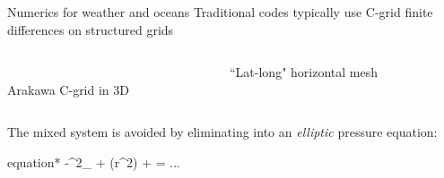 \documentclass[9pt]{beamer}
\begin{document}
\begin{frame}[c]{Numerics for weather and oceans}
	Traditional codes typically use C-grid finite differences
	on structured grids
	\begin{columns}
		\begin{column}{0.5\textwidth}
			\begin{center}
				\begin{tikzpicture}[thick, scale=0.5]
					
				\end{tikzpicture}\\
				Arakawa C-grid in 3D
			\end{center}
		\end{column}
		\hspace{-20pt}\begin{column}{0.5\textwidth}
			\begin{center}
				\begin{tikzpicture}[thick, scale=0.5]
					
				\end{tikzpicture}
				``Lat-long" horizontal mesh	
			\end{center}
		\end{column}
	\end{columns}
	The mixed system is avoided by eliminating into an
	\emph{elliptic} pressure equation:
	\begin{empheq}[box=\fbox]{equation*}
		-\omega\left\lbrack \nabla^2_ \Pi + 
		\left(r^2\right)
		\right\rbrack + \Pi = ...
	\end{empheq}
\end{frame}
\end{document}
